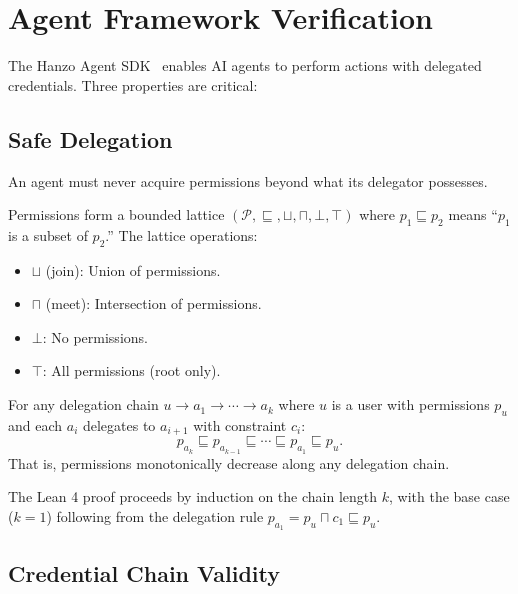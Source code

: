 \section{Agent Framework Verification}

\label{sec:agents}

The Hanzo Agent SDK~\cite{hanzoagentsdk} enables AI agents to perform
actions with delegated credentials. Three properties are critical:

\subsection{Safe Delegation}

An agent must never acquire permissions beyond what its delegator possesses.

\begin{definition}
Permissions form a bounded lattice $(\mathcal{P}, \sqsubseteq, \sqcup, \sqcap,
\bot, \top)$ where $p_1 \sqsubseteq p_2$ means ``$p_1$ is a subset of $p_2$.''
The lattice operations:
\begin{itemize}[leftmargin=1.1em]
    \item $\sqcup$ (join): Union of permissions.
    \item $\sqcap$ (meet): Intersection of permissions.
    \item $\bot$: No permissions.
    \item $\top$: All permissions (root only).
\end{itemize}
\end{definition}

\begin{theorem}
\label{thm:safe-delegation}
For any delegation chain $u \to a_1 \to \cdots \to a_k$ where $u$ is a user
with permissions $p_u$ and each $a_i$ delegates to $a_{i+1}$ with constraint
$c_i$:
\begin{equation}
p_{a_k} \sqsubseteq p_{a_{k-1}} \sqsubseteq \cdots \sqsubseteq p_{a_1}
\sqsubseteq p_u.
\end{equation}
That is, permissions monotonically decrease along any delegation chain.
\end{theorem}

The Lean 4 proof proceeds by induction on the chain length $k$, with the base
case ($k=1$) following from the delegation rule $p_{a_1} = p_u \sqcap c_1
\sqsubseteq p_u$.

\subsection{Credential Chain Validity}

